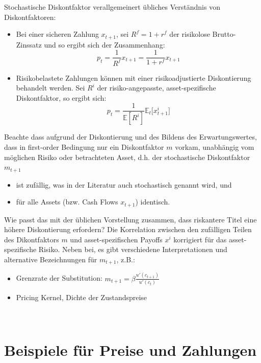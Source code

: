 \documentclass[12pt]{extreport} %
\theoremstyle{named}
\theoremstyle{nnamed}
\theoremstyle{itshape}
\theoremstyle{normal}
\begin{document}
Stochastische Diskontfaktor verallgemeinert übliches Verständnis von Diskontfaktoren:

\begin{itemize}
	\item Bei einer sicheren Zahlung $x_{t+1}$, sei $R^f = 1 + r^f$ der risikolose Brutto-Zinssatz und so ergibt sich der Zusammenhang: $$p_t = \frac{1}{R^f} x_{t+1} = \frac{1}{1+r^f} x_{t+1}$$
	\item Risikobelastete Zahlungen können mit einer risikoadjustierte Diskontierung behandelt werden. Sei $R^i$ der risiko-angepasste, asset-spezifische Diskontfaktor, so ergibt sich: $$p_t = \frac{1}{\mathbb{E} \left[R^i \right]} \mathbb{E}_t \big[ x_{t+1}^i \big]$$
\end{itemize}

Beachte dass aufgrund der Diskontierung und des Bildens des Erwartungswertes, dass in first-order Bedingung nur ein Diskontfaktor $m$ vorkam, unabhängig vom möglichen Risiko oder betrachteten Asset, d.h. der stochastische Diskontfaktor $m_{t+1}$
\begin{itemize}
	\item ist zufällig, was in der Literatur auch stochastisch genannt wird, und
	\item für alle Assets (bzw. Cash Flows $x_{t+1}$) identisch.
\end{itemize}
Wie passt das mit der üblichen Vorstellung zusammen, dass riskantere Titel eine höhere Diskontierung erfordern? Die Korrelation zwischen den zufälligen Teilen des Dikontfaktors $m$ und asset-spezifischen Payoffs $x^i$ korrigiert für das asset-spezifische Risiko. Neben bei, es gibt verschiedene Interpretationen und alternative Bezeichnungen für $m_{t+1}$, z.B.:
\begin{itemize}
	\item Grenzrate der Substitution: $m_{t+1} = \beta \frac{u'(c_{t+1})}{u'(c_t)}$
	\item Pricing Kernel, Dichte der Zustandspreise
\end{itemize}

~\newpage

\section{Beispiele für Preise und Zahlungen}
\end{document}
